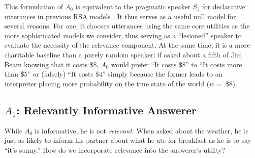 \documentclass[11pt, floatsintext]{apa6}
\begin{document}
This formulation of $A_0$ is equivalent to the pragmatic speaker $S_1$ for declarative utterances in previous RSA models \cite{GoodmanFrank16_RSATiCS}. 
It thus serves as a useful null model for several reasons. 
For one, it chooses utterances using the same core utilities as the more sophisticated models we consider, thus serving as a ``lesioned'' speaker to evaluate the necessity of the relevance component. 
At the same time, it is a more charitable baseline than a purely random speaker: if asked about a fifth of Jim Beam knowing that it costs \$8, $A_0$ would prefer ``It costs \$8'' to ``It costs more than \$5'' or (falsely) ``It costs \$4'' simply because the former leads to an interpreter placing more probability on the true state of the world ($w = $ \$8).


\subsection{$A_1$: Relevantly Informative Answerer}

While $A_0$ is informative, he is not \emph{relevant}. When asked about the weather, he is just as likely to inform his partner about what he ate for breakfast as he is to say ``it's sunny.'' How do we incorporate relevance into the answerer's utility? 
\end{document}
